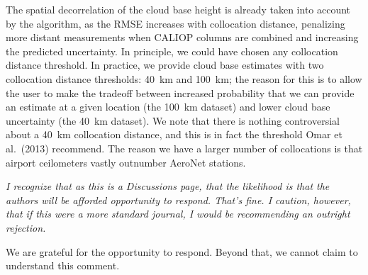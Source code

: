 \documentclass[12pt,a4paper]{responses}
\begin{document}
The spatial decorrelation of the cloud base height is already taken into account
by the algorithm, as the RMSE increases with collocation distance, penalizing
more distant measurements when CALIOP columns are combined and increasing the
predicted uncertainty.  In principle, we could have chosen any collocation
distance threshold.  In practice, we provide cloud base estimates with two
collocation distance thresholds: 40~km and 100~km; the reason for this is to
allow the user to make the tradeoff between increased probability that we can
provide an estimate at a given location (the 100~km dataset) and lower cloud
base uncertainty (the 40~km dataset).  We note that there is nothing
controversial about a 40~km collocation distance, and this is in fact the
threshold Omar et al.~(2013) recommend.  The reason we have a larger number of
collocations is that airport ceilometers vastly outnumber AeroNet stations.

\textit{I recognize that as this is a Discussions page, that the likelihood is that the authors will
be afforded opportunity to respond.  That’s fine.  I caution, however, that if this were a
more standard journal, I would be recommending an outright rejection.}

We are grateful for the opportunity to respond.  Beyond that, we cannot claim to
understand this comment.
\end{document}
